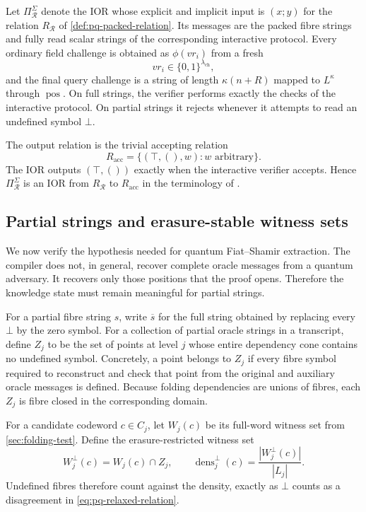 \begin{definition}
\label{def:pq-application-ior}
Let $\Pi_{\mathcal R}^{\Sigma}$ denote the IOR whose explicit and implicit input is $(x;y)$ for the relation $R_{\mathcal R}$ of \cref{def:pq-packed-relation}.  Its messages are the packed fibre strings and fully read scalar strings of the corresponding interactive protocol.  Every ordinary field challenge is obtained as $\phi(vr_i)$ from a fresh
\[
  vr_i\in\{0,1\}^{\lambda_{\mathrm{ch}}},
\]
and the final query challenge is a string of length $\kappa(n+R)$ mapped to $L^\kappa$ through $\operatorname{pos}$.  On full strings, the verifier performs exactly the checks of the interactive protocol.  On partial strings it rejects whenever it attempts to read an undefined symbol $\bot$.
\end{definition}

The output relation is the trivial accepting relation
\[
  R_{\mathrm{acc}}=\{(\top,(),w):w\text{ arbitrary}\}.
\]
The IOR outputs $(\top,())$ exactly when the interactive verifier accepts.  Hence $\Pi_{\mathcal R}^{\Sigma}$ is an IOR from $R_{\mathcal R}$ to $R_{\mathrm{acc}}$ in the terminology of \cite{CDHZ25}.

\subsection{Partial strings and erasure-stable witness sets}
\label{sec:pq-erasures}

We now verify the hypothesis needed for quantum Fiat--Shamir extraction.  The compiler does not, in general, recover complete oracle messages from a quantum adversary.  It recovers only those positions that the proof opens.  Therefore the knowledge state must remain meaningful for partial strings.

For a partial fibre string $s$, write $\overline{s}$ for the full string obtained by replacing every $\bot$ by the zero symbol.  For a collection of partial oracle strings in a transcript, define $Z_j$ to be the set of points at level $j$ whose entire dependency cone contains no undefined symbol.  Concretely, a point belongs to $Z_j$ if every fibre symbol required to reconstruct and check that point from the original and auxiliary oracle messages is defined.  Because folding dependencies are unions of fibres, each $Z_j$ is fibre closed in the corresponding domain.

For a candidate codeword $c\in C_j$, let $W_j(c)$ be its full-word witness set from \cref{sec:folding-test}.  Define the erasure-restricted witness set
\begin{equation}
  W_j^{\bot}(c)=W_j(c)\cap Z_j,
  \qquad
  \operatorname{dens}_j^{\bot}(c)
  =\frac{|W_j^{\bot}(c)|}{|L_j|}.
  \label{eq:pq-erasure-witness-set}
\end{equation}
Undefined fibres therefore count against the density, exactly as $\bot$ counts as a disagreement in \cref{eq:pq-relaxed-relation}.

